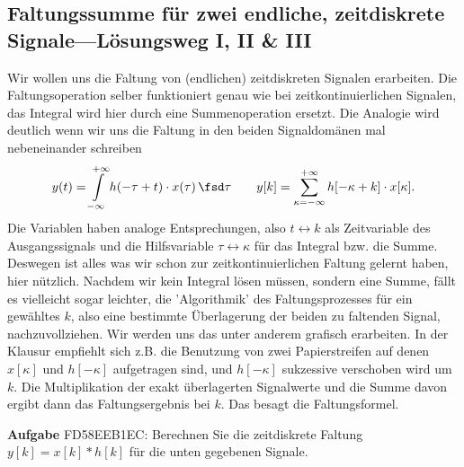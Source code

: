 \clearpage
\subsection{Faltungssumme für zwei endliche, zeitdiskrete Signale---Lösungsweg I, II \& III}
\label{sec:FD58EEB1EC}
\begin{Ziel}
Wir wollen uns die Faltung von (endlichen) zeitdiskreten Signalen erarbeiten.
Die Faltungsoperation selber funktioniert genau wie bei zeitkontinuierlichen
Signalen, das Integral wird hier durch eine Summenoperation ersetzt.
Die Analogie wird deutlich wenn wir uns die Faltung in den beiden
Signaldomänen mal nebeneinander schreiben
\begin{align}
y(t) = \int\limits_{-\infty}^{+\infty} h(-\tau+t) \cdot x(\tau) \, \fsd \tau\qquad
y[k] = \sum\limits_{\kappa = -\infty}^{+\infty} h[-\kappa+k] \cdot x[\kappa].
\end{align}
Die Variablen haben analoge Entsprechungen, also $t \leftrightarrow k$ als
Zeitvariable des Ausgangssignals und
die Hilfsvariable $\tau \leftrightarrow \kappa$ für das Integral bzw. die Summe.
%
Deswegen ist alles was wir schon zur zeitkontinuierlichen Faltung gelernt haben,
hier nützlich.
%
Nachdem wir kein Integral lösen müssen, sondern eine Summe,
fällt es vielleicht sogar leichter, die 'Algorithmik' des Faltungsprozesses
für ein gewähltes $k$, also eine bestimmte Überlagerung der beiden zu faltenden
Signal, nachzuvollziehen.
%
Wir werden uns das unter anderem grafisch erarbeiten. In der Klausur empfiehlt sich z.B.
die Benutzung von zwei Papierstreifen auf denen $x[\kappa]$ und $h[-\kappa]$
aufgetragen sind, und $h[-\kappa]$ sukzessive verschoben wird um $k$. Die
Multiplikation der exakt überlagerten Signalwerte und die Summe davon ergibt
dann das Faltungsergebnis bei $k$. Das besagt die Faltungsformel.
\end{Ziel}
\textbf{Aufgabe} {\tiny FD58EEB1EC}: Berechnen Sie die zeitdiskrete Faltung
$y[k] = x[k] \ast h[k]$ für die unten gegebenen Signale.
%
\begin{center}
\end{center}
